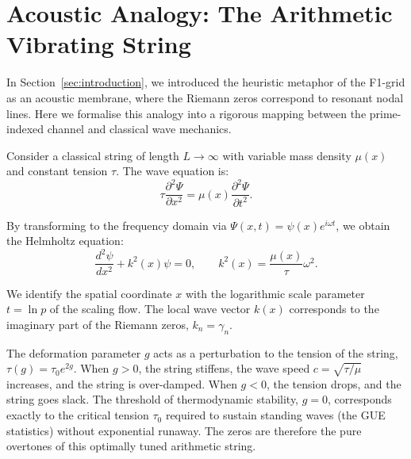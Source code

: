 \documentclass[11pt,a4paper]{article}
\begin{document}
\section{Acoustic Analogy: The Arithmetic Vibrating String}
\label{app:acoustic}

In Section~\ref{sec:introduction}, we introduced the heuristic metaphor of the F1-grid as an acoustic membrane, where the Riemann zeros correspond to resonant nodal lines. Here we formalise this analogy into a rigorous mapping between the prime-indexed channel and classical wave mechanics.

Consider a classical string of length $L \to \infty$ with variable mass density $\mu(x)$ and constant tension $\tau$. The wave equation is:
\begin{equation}
\tau \frac{\partial^2 \Psi}{\partial x^2} = \mu(x) \frac{\partial^2 \Psi}{\partial t^2}.
\end{equation}

By transforming to the frequency domain via $\Psi(x,t) = \psi(x) e^{i\omega t}$, we obtain the Helmholtz equation:
\begin{equation}
\frac{d^2 \psi}{dx^2} + k^2(x) \psi = 0, \qquad k^2(x) = \frac{\mu(x)}{\tau} \omega^2.
\end{equation}

We identify the spatial coordinate $x$ with the logarithmic scale parameter $t = \ln p$ of the scaling flow. The local wave vector $k(x)$ corresponds to the imaginary part of the Riemann zeros, $k_n = \gamma_n$.

The deformation parameter $g$ acts as a perturbation to the tension of the string, $\tau(g) = \tau_0 e^{2g}$. When $g > 0$, the string stiffens, the wave speed $c = \sqrt{\tau/\mu}$ increases, and the string is over-damped. When $g < 0$, the tension drops, and the string goes slack. The threshold of thermodynamic stability, $g = 0$, corresponds exactly to the critical tension $\tau_0$ required to sustain standing waves (the GUE statistics) without exponential runaway. The zeros are therefore the pure overtones of this optimally tuned arithmetic string.
\end{document}
